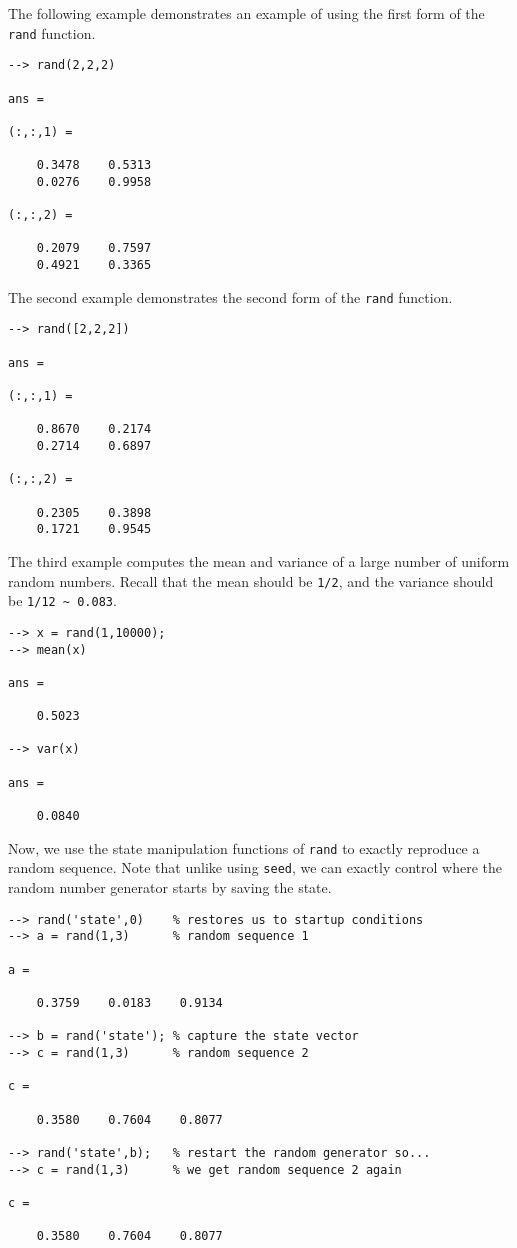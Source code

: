 The following example demonstrates an example of using the first form of the \verb|rand| function.
\begin{verbatim}
--> rand(2,2,2)

ans = 

(:,:,1) = 

    0.3478    0.5313 
    0.0276    0.9958 

(:,:,2) = 

    0.2079    0.7597 
    0.4921    0.3365 
\end{verbatim}
The second example demonstrates the second form of the \verb|rand| function.
\begin{verbatim}
--> rand([2,2,2])

ans = 

(:,:,1) = 

    0.8670    0.2174 
    0.2714    0.6897 

(:,:,2) = 

    0.2305    0.3898 
    0.1721    0.9545 
\end{verbatim}
The third example computes the mean and variance of a large number of uniform random numbers.  Recall that the mean should be \verb|1/2|, and the variance should be \verb|1/12 ~ 0.083|.
\begin{verbatim}
--> x = rand(1,10000);
--> mean(x)

ans = 

    0.5023 

--> var(x)

ans = 

    0.0840 
\end{verbatim}
Now, we use the state manipulation functions of \verb|rand| to exactly reproduce 
a random sequence.  Note that unlike using \verb|seed|, we can exactly control where
the random number generator starts by saving the state.
\begin{verbatim}
--> rand('state',0)    % restores us to startup conditions
--> a = rand(1,3)      % random sequence 1

a = 

    0.3759    0.0183    0.9134 

--> b = rand('state'); % capture the state vector
--> c = rand(1,3)      % random sequence 2  

c = 

    0.3580    0.7604    0.8077 

--> rand('state',b);   % restart the random generator so...
--> c = rand(1,3)      % we get random sequence 2 again

c = 

    0.3580    0.7604    0.8077 
\end{verbatim}

